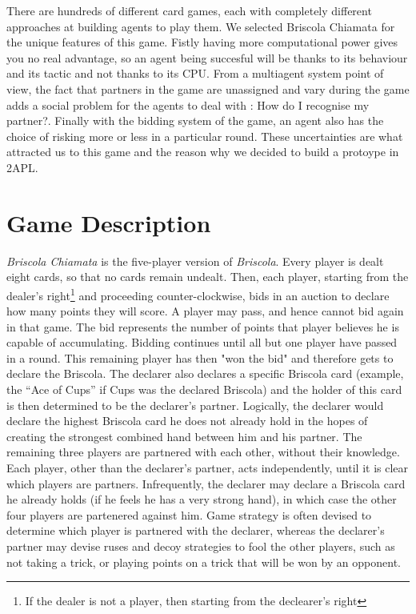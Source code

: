 \documentclass[a4paper]{article}
\begin{document}
There are hundreds of different card games, each with completely different approaches at building agents to play them. We selected Briscola Chiamata for the unique features of this game. Fistly having more computational power gives you no real advantage, so an agent being succesful will be thanks to its behaviour and its tactic and not thanks to its CPU. From a multiagent system point of view, the fact that partners in the game are unassigned and vary during the game adds a social problem for the agents to deal with : How do I recognise my partner?. Finally with the bidding system of the game, an agent also has the choice of risking more or less in a particular round. These uncertainties are what attracted us to this game and the reason why we decided to build a protoype in 2APL.


\section{Game Description}

\emph{Briscola Chiamata} is the five-player version of \emph{Briscola}. Every player is dealt eight cards, so that no cards remain undealt. Then, each player, starting from the dealer's right\footnote{If the dealer is not a player, then starting from the declearer's right} and proceeding counter-clockwise, bids in an auction to declare how many points they will score. A player may pass, and hence cannot bid again in that game. The bid represents the number of points that player believes he is capable of accumulating. Bidding continues until all but one player have passed in a round. This remaining player has then "won the bid" and therefore gets to declare the Briscola. The declarer also declares a specific Briscola card (example, the ``Ace of Cups'' if Cups was the declared Briscola) and the holder of this card is then determined to be the declarer's partner. Logically, the declarer would declare the highest Briscola card he does not already hold in the hopes of creating the strongest combined hand between him and his partner.
The remaining three players are partnered with each other, without their knowledge. Each player, other than the declarer's partner, acts independently, until it is clear which players are partners. Infrequently, the declarer may declare a Briscola card he already holds (if he feels he has a very strong hand), in which case the other four players are partenered against him.
Game strategy is often devised to determine which player is partnered with the declarer, whereas the declarer's partner may devise ruses and decoy strategies to fool the other players, such as not taking a trick, or playing points on a trick that will be won by an opponent.
\end{document}
